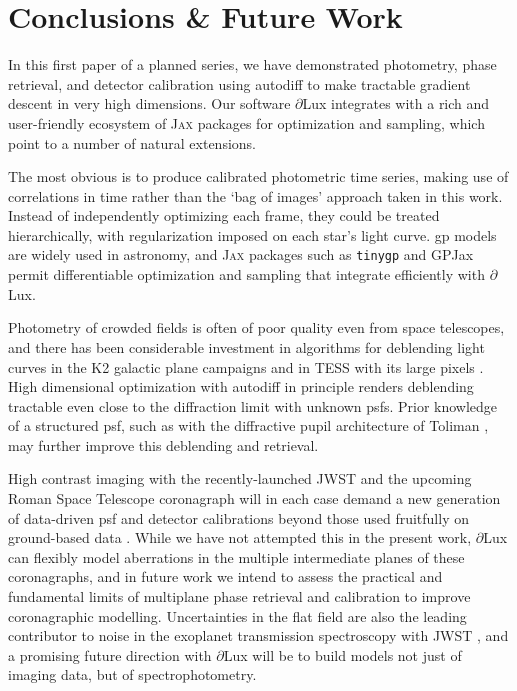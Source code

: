 \documentclass[]{spieman}
\newcommand\jax{\textsc{Jax}\xspace}
\newcommand\dlux{$\partial$Lux\xspace}
\begin{document}

\section{Conclusions \& Future Work}
In this first paper of a planned series, we have demonstrated photometry, phase retrieval, and detector calibration using autodiff to make tractable gradient descent in very high dimensions. Our software \dlux integrates with a rich and user-friendly ecosystem of \jax packages for optimization and sampling, which point to a number of natural extensions.

The most obvious is to produce calibrated photometric time series, making use of correlations in time rather than the `bag of images' approach taken in this work. Instead of independently optimizing each frame, they could be treated hierarchically, with regularization imposed on each star's light curve. \ac{gp} models are widely used in astronomy, and \jax packages such as \texttt{tinygp} \cite{Aigrain2022} and GPJax \cite{Pinder2022} permit differentiable optimization and sampling that integrate efficiently with \dlux. 

Photometry of crowded fields is often of poor quality even from space telescopes, and there has been considerable investment in algorithms for deblending light curves in the K2 galactic plane campaigns \cite{Zhu2017} and in TESS with its large pixels \cite{Nardiello2019,Hedges2021,Higgins2022}. High dimensional optimization with autodiff in principle renders deblending tractable even close to the diffraction limit with unknown \ac{psf}s. Prior knowledge of a structured \ac{psf}, such as with the diffractive pupil architecture of Toliman \cite{Guyon2012,Guyon2013}, may further improve this deblending and retrieval. 

High contrast imaging with the recently-launched JWST \cite{Gardner2006} and the upcoming Roman Space Telescope coronagraph \cite{Zellem2022} will in each case demand a new generation of data-driven \ac{psf} and detector calibrations beyond those used fruitfully on ground-based data \cite{Cantalloube2021}. While we have not attempted this in the present work, \dlux can flexibly model aberrations in the multiple intermediate planes of these coronagraphs, and in future work we intend to assess the practical and fundamental limits of multiplane phase retrieval and calibration to improve coronagraphic modelling.
Uncertainties in the flat field are also the leading contributor to noise in the exoplanet transmission spectroscopy with JWST \cite{Rustamkulov2022}, and a promising future direction with \dlux will be to build models not just of imaging data, but of spectrophotometry.
\end{document}
